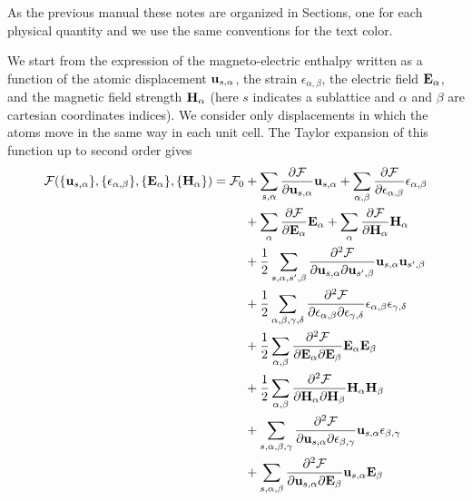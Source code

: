\documentclass[12pt,a4paper,twoside]{report}
\begin{document}
As the previous manual these notes are organized in Sections, one for 
each physical quantity and we use the same conventions for the text color.

We start from the expression of the magneto-electric enthalpy 
written as a function of the atomic displacement 
${\bf u}_{s,\alpha}$, the strain $\epsilon_{\alpha,\beta}$, the electric
field ${\bf E}_\alpha$, and the magnetic field strength ${\bf H}_\alpha$
(here $s$ indicates a sublattice and $\alpha$ and $\beta$ are cartesian
coordinates indices). We consider only displacements in which the
atoms move in the same way in each unit cell.
The Taylor expansion of this function up to second order gives
\begin{align}
\mathcal{F}(\{{\bf u}_{s,\alpha}\}, \{\epsilon_{\alpha,\beta}\},
\{ {\bf E}_\alpha\}, \{{\bf H}_\alpha\})=\mathcal{F}_0 &+
\sum_{s,\alpha} {\partial \mathcal{F} \over \partial 
{\bf u}_{s,\alpha}} {\bf u}_{s,\alpha}+ \sum_{\alpha,\beta}
{\partial \mathcal{F} \over \partial 
\epsilon_{\alpha,\beta}} \epsilon_{\alpha,\beta} \nonumber \\ 
&+\sum_{\alpha}
{\partial \mathcal{F} \over \partial 
{\bf E}_\alpha} {\bf E}_\alpha + 
\sum_{\alpha}
{\partial \mathcal{F} \over \partial 
{\bf H}_\alpha} {\bf H}_\alpha \nonumber \\
&+{1\over 2}
\sum_{s,\alpha,s',\beta} {\partial^2 \mathcal{F} \over \partial 
{\bf u}_{s,\alpha} \partial {\bf u}_{s',\beta}} {\bf u}_{s,\alpha}
{\bf u}_{s',\beta}\nonumber \\
&+ {1\over 2}\sum_{\alpha,\beta,\gamma,\delta} 
{\partial^2 \mathcal{F} \over \partial 
\epsilon_{\alpha,\beta} \partial \epsilon_{\gamma,\delta}} 
\epsilon_{\alpha,\beta}
\epsilon_{\gamma,\delta} \nonumber \\
&+ {1\over 2} \sum_{\alpha,\beta} 
{\partial^2 \mathcal{F} \over \partial 
{\bf E}_{\alpha} \partial {\bf E}_{\beta}} 
{\bf E}_{\alpha}
{\bf E}_{\beta} \nonumber \\
&+ {1\over 2} \sum_{\alpha,\beta} 
{\partial^2 \mathcal{F} \over \partial 
{\bf H}_{\alpha} \partial {\bf H}_{\beta}} 
{\bf H}_{\alpha}
{\bf H}_{\beta} \nonumber \\
&+ \sum_{s,\alpha,\beta,\gamma} {\partial^2 \mathcal{F} \over \partial 
{\bf u}_{s,\alpha} \partial \epsilon_{\beta,\gamma}} {\bf u}_{s,\alpha}
\epsilon_{\beta,\gamma}\nonumber \\
&+ \sum_{s,\alpha,\beta} {\partial^2 \mathcal{F} \over \partial 
{\bf u}_{s,\alpha} \partial {\bf E}_{\beta}} {\bf u}_{s,\alpha}
{\bf E}_{\beta} \nonumber \\

\end{align}
\end{document}
